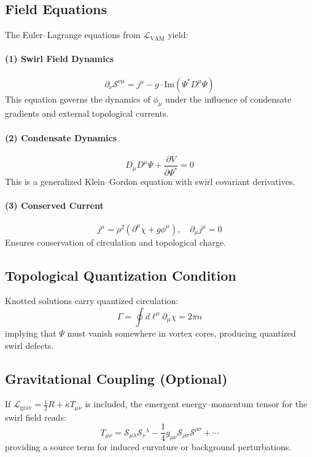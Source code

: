 \subsection{Field Equations}
The Euler--Lagrange equations from $\mathcal{L}_\text{VAM}$ yield:
\paragraph{(1) Swirl Field Dynamics}
\begin{equation}
    \partial_\nu \mathcal{S}^{\nu\mu} = j^\mu - g \cdot \mathrm{Im}(\Psi^* D^\mu \Psi)
\end{equation}
This equation governs the dynamics of $\phi_\mu$ under the influence of condensate gradients and external topological currents.

\paragraph{(2) Condensate Dynamics}
\begin{equation}
    D_\mu D^\mu \Psi + \frac{\partial V}{\partial \Psi^*} = 0
\end{equation}
This is a generalized Klein--Gordon equation with swirl covariant derivatives.

\paragraph{(3) Conserved Current}
\begin{equation}
    j^\mu = \rho^2 (\partial^\mu \chi + g \phi^\mu), \quad \partial_\mu j^\mu = 0
\end{equation}
Ensures conservation of circulation and topological charge.

\subsection{Topological Quantization Condition}
Knotted solutions carry quantized circulation:
\begin{equation}
    \Gamma = \oint d\ell^\mu \partial_\mu \chi = 2\pi n
\end{equation}
implying that $\Psi$ must vanish somewhere in vortex cores, producing quantized swirl defects.

\subsection{Gravitational Coupling (Optional)}
If $\mathcal{L}_{\text{grav}} = \frac{1}{2} R + \kappa T_{\mu\nu}$ is included, the emergent energy--momentum tensor for the swirl field reads:
\begin{equation}
    T_{\mu\nu} = \mathcal{S}_{\mu\lambda} \mathcal{S}_\nu{}^\lambda - \frac{1}{4} g_{\mu\nu} \mathcal{S}_{\rho\sigma} \mathcal{S}^{\rho\sigma} + \cdots
\end{equation}
providing a source term for induced curvature or background perturbations.

